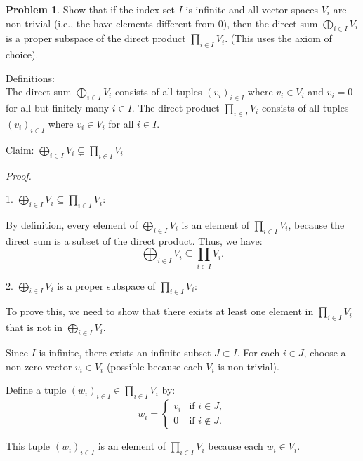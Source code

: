 \documentclass[12pt]{article}
\theoremstyle{definition}
\newtheorem{problem}{Problem}
\begin{document}
\begin{problem}
    Show that if the index set $I$ is infinite and all vector spaces $V_i$ are non-trivial (i.e., the have elements different from $0$), then the direct sum $\bigoplus_{i \in I}V_i$ is a proper
    subspace of the direct product $\prod_{i \in I}V_i$. (This uses the axiom of choice). 

    \begin{solution}
        Definitions:\\
        The direct sum \(\bigoplus_{i \in I} V_i\) consists of all tuples \((v_i)_{i \in I}\) where \( v_i \in V_i \) and \( v_i = 0 \) for all but finitely many \( i \in I \).
        The direct product \(\prod_{i \in I} V_i\) consists of all tuples \((v_i)_{i \in I}\) where \( v_i \in V_i \) for all \( i \in I \).
    
        Claim: \(\bigoplus_{i \in I} V_i \subsetneq \prod_{i \in I} V_i\)
    
        \textit{Proof.}
    
        1. \(\bigoplus_{i \in I} V_i \subseteq \prod_{i \in I} V_i\):
    
            By definition, every element of \(\bigoplus_{i \in I} V_i\) is an element of \(\prod_{i \in I} V_i\), because the direct sum is a subset of the direct product. Thus, we have:
            \[
            \bigoplus_{i \in I} V_i \subseteq \prod_{i \in I} V_i.
            \]
    
        2. \(\bigoplus_{i \in I} V_i\) is a proper subspace of \(\prod_{i \in I} V_i\):
    
            To prove this, we need to show that there exists at least one element in \(\prod_{i \in I} V_i\) that is not in \(\bigoplus_{i \in I} V_i\).
    
            Since \( I \) is infinite, there exists an infinite subset \( J \subset I \). For each \( i \in J \), choose a non-zero vector \( v_i \in V_i \) (possible because each \( V_i \) is non-trivial).
    
            Define a tuple \( (w_i)_{i \in I} \in \prod_{i \in I} V_i \) by:
            \[
            w_i = 
            \begin{cases} 
            v_i & \text{if } i \in J, \\
            0 & \text{if } i \notin J.
            \end{cases}
            \]
    
            This tuple \( (w_i)_{i \in I} \) is an element of \(\prod_{i \in I} V_i\) because each \( w_i \in V_i \).
    

\end{solution}
\end{problem}
\end{document}

